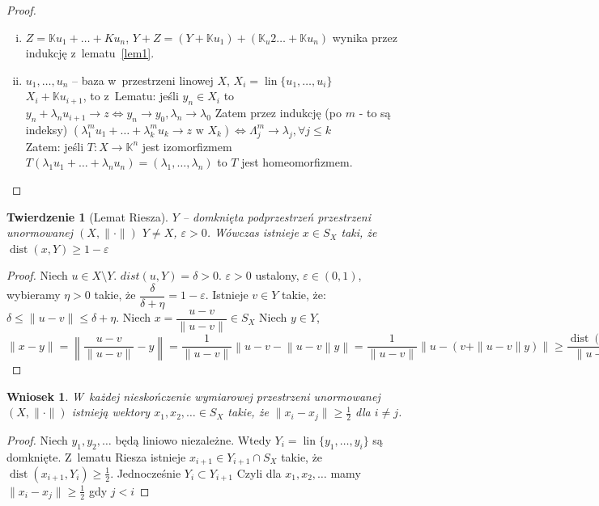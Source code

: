 \documentclass[10pt]{article}
\renewcommand{\[}{\begin{equation}}
\renewcommand{\]}{\end{equation}}
\newcommand{\K}{\ensuremath{\mathbb{K}}}
\newcommand{\lin}{\operatorname{lin}}
\newcommand{\dist}{\operatorname{dist}}
\newtheorem{twr}[subsubsection]{Twierdzenie}%
\newtheorem{wn}[subsubsection]{Wniosek}
\newcounter{numer}
\begin{document}
\begin{proof}
	\begin{enumerate}[(i)]
	  \item $Z= \K u_1 + \ldots + K u_n$, $Y+Z = (Y+\K u_1) +(\K _u2 \ldots + \K u_n)$ wynika przez indukcję z~lematu~\ref{lem1}.  
		\item $u_1 , \ldots, u_n$ -- baza w~przestrzeni linowej $X$, $X_i = \lin\{ u_1, \ldots, u_i\}$ \\
			$X_i+\K u_{i+1}$, to z~Lematu: jeśli $y_n \in X_i$ to 
			$ y_n + \lambda_n u_{i+1}  \to z \Leftrightarrow y_n \to y_0, \lambda_n \to \lambda_0$
			Zatem przez indukcję (po $m$ - to są indeksy) 
			$(\lambda_1^m u_1 + \ldots + \lambda_k^m u_k\to z \textrm{ w } X_k) \Leftrightarrow \Lambda_j^m \to \lambda_j,\forall j \le k$\\
			Zatem: jeśli $T:X  \to \K^n$ jest izomorfizmem 
			$T\left( \lambda_1 u_1 + \ldots + \lambda_n u_n  \right) = \left( \lambda_1,\ldots,\lambda_n \right)$
			to $T$ jest homeomorfizmem.
	\end{enumerate}
\end{proof}
\begin{twr}[Lemat Riesza]
	$Y$ -- domknięta podprzestrzeń przestrzeni unormowanej $(X,\|\cdot\|)$ $Y \not = X$, $\varepsilon>0$. 
	Wówczas istnieje $x\in S_X$ taki, że $\dist(x,Y)\ge 1 -\varepsilon$
\end{twr}
\begin{proof}
	Niech $u \in X\setminus Y$. $dist(u,Y) = \delta>0$. $\varepsilon>0$ ustalony, $\varepsilon\in (0,1)$, wybieramy $\eta>0$ takie, że 
	$\dfrac{\delta}{\delta+\eta}=1- \varepsilon$. Istnieje $v\in Y$ takie, że:
	$\delta\le \|u-v\| \le \delta+\eta$.
	Niech $x= \dfrac{u-v}{\|u-v\|} \in S_X$ 
	Niech $y\in Y$, $\|x-y\|= \left\|\dfrac{u-v}{\|u-v\|} - y\right\|= \dfrac{1}{\|u-v\|} \left\|u-v-\left\|u-v\right\|y\right\|= 
	\dfrac{1}{\|u-v\|} \left\|u- \left( v+ \|u-v\| y \right)\right\| \ge \dfrac{\dist(u,Y)}{\|u-v\|} \ge \dfrac{\delta}{\delta+\eta} = 1 -\varepsilon$
\end{proof}
\begin{wn}
  W~każdej nieskończenie wymiarowej przestrzeni unormowanej $(X,\|\cdot\|)$ istnieją wektory $x_1, x_2, \ldots  \in S_X$ 
  takie, że $\|x_i-x_j\|\ge \frac{1}{2}$ dla $i\not= j$.
\end{wn}
\begin{proof}
	Niech $y_1, y_2, \ldots$ będą  liniowo niezależne. Wtedy $Y_i = \lin\{y_1,\ldots, y_i \}$ są domknięte.
	Z~lematu Riesza istnieje $x_{i+1}  \in Y_{i+1} \cap S_X$ takie, że $\dist (x_{i+1}, Y_i) \ge \frac{1}{2}$. Jednocześnie $Y_i \subset Y_{i+1}$
	Czyli dla $x_1, x_2, \ldots $ mamy $\|x_i-x_j\|\ge \frac{1}{2}$ gdy $ j<i$
\end{proof}
\end{document}
